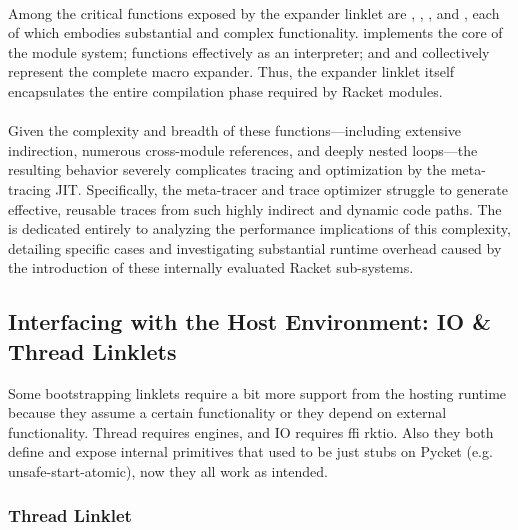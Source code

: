 			\paragraph{}%
				Among the critical functions exposed by the expander linklet are , , , and , each of which embodies substantial and complex functionality.  implements the core of the module system;  functions effectively as an interpreter; and  and  collectively represent the complete macro expander. Thus, the expander linklet itself encapsulates the entire compilation phase required by Racket modules.

			\paragraph{}%
				Given the complexity and breadth of these functions—including extensive indirection, numerous cross-module references, and deeply nested loops—the resulting behavior severely complicates tracing and optimization by the meta-tracing JIT. Specifically, the meta-tracer and trace optimizer struggle to generate effective, reusable traces from such highly indirect and dynamic code paths. The  is dedicated entirely to analyzing the performance implications of this complexity, detailing specific cases and investigating substantial runtime overhead caused by the introduction of these internally evaluated Racket sub-systems.

		\subsection{Interfacing with the Host Environment: IO \& Thread Linklets}

			\begin{paragraph-here}%
				Some bootstrapping linklets require a bit more support from the hosting runtime because they assume a certain functionality or they depend on external functionality. Thread requires engines, and IO requires ffi rktio. Also they both define and expose internal primitives that used to be just stubs on Pycket (e.g. unsafe-start-atomic), now they all work as intended.
			\end{paragraph-here}

			\subsubsection{Thread Linklet}

